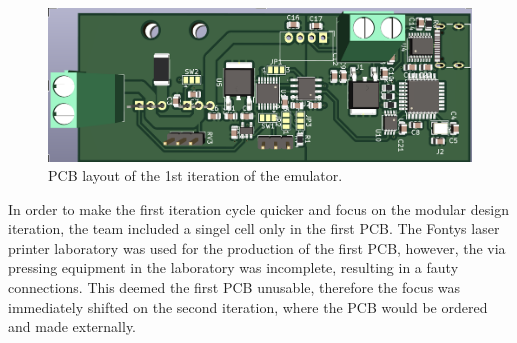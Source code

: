 \begin{figure}[h]
    \centering
    \includegraphics[scale=0.45]{pcb_1st_iteration.png}
    \caption{PCB layout of the 1st iteration of the emulator.}
\end{figure}


In order to make the first iteration cycle quicker and focus on the modular design 
iteration, the team included a singel cell only in the first PCB. The Fontys laser
printer laboratory was used for the production of the first PCB, however, the via pressing
equipment in the laboratory was incomplete, resulting in a fauty connections. This 
deemed the first PCB unusable, therefore the focus was immediately shifted on the 
second iteration, where the PCB would be ordered and made externally.
